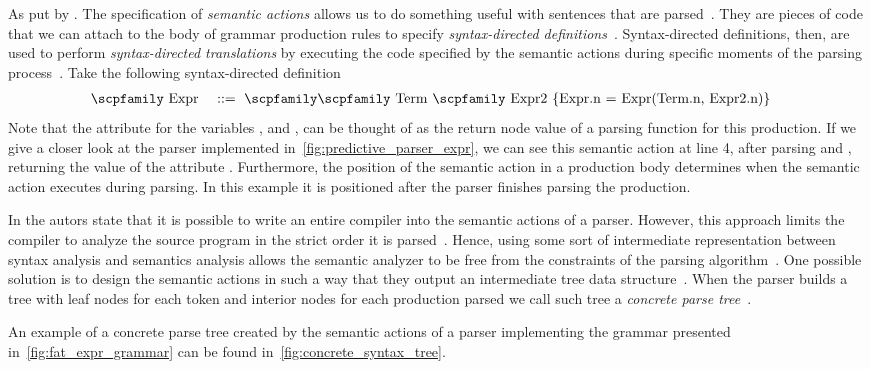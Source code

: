 \documentclass[
  oneside,
  english,
  coorientadorbanca,
  noabntexcite
]{ufsc-thesis-rn46-2019}
\def\bnfdef{::=}
\newcommand{\codett}[1]{\text{\scpfamily#1}}
\newcommand{\code}[1]{\text{\scpfamily\setlength\spaceskip{0.35em}#1}}
\newcommand{\bnfvar}[1]{\codett{#1}}
\newcommand{\bnfprod}[2]{\bnfvar{#1} & \ & \bnfdef{} & \ \code{#2}}
\begin{document}
As put by \textcite{appel2003modern} .
The specification of \textit{semantic actions} allows us to do something useful with sentences that are parsed~\cite{appel2003modern}.
They are pieces of code that we can attach to the body of grammar production rules to specify \textit{syntax-directed definitions}~\cite{Aho:2006:CPT:1177220}.
Syntax-directed definitions, then, are used to perform \textit{syntax-directed translations} by executing the code specified by the semantic actions during specific moments of the parsing process~\cite{Aho:2006:CPT:1177220}.
Take the following syntax-directed definition
\begin{alignat}{2}
  \bnfprod{Expr}{\bnfvar{Term} \bnfvar{Expr2} \{Expr.n = Expr(Term.n, Expr2.n)\}} \label{eq:sdd_example}
\end{alignat}
Note that the attribute \codett{n} for the variables \bnfvar{Expr}, \bnfvar{Term} and \bnfvar{Expr2}, can be thought of as the return node value of a parsing function for this production.
If we give a closer look at the parser implemented in~\cref{fig:predictive_parser_expr}, we can see this semantic action at line 4, after parsing \bnfvar{Term} and \bnfvar{Expr2}, returning the value of the attribute \codett{Expr.n}.
Furthermore, the position of the semantic action in a production body determines when the semantic action executes during parsing.
In this example it is positioned after the parser finishes parsing the production.

In \textcite{appel2003modern} the autors state that it is possible to write an entire compiler into the semantic actions of a parser.
However, this approach limits the compiler to analyze the source program in the strict order it is parsed~\cite{appel2003modern}.
Hence, using some sort of intermediate representation between syntax analysis and semantics analysis allows the semantic analyzer to be free from the constraints of the parsing algorithm~\cite{appel2003modern}.
One possible solution is to design the semantic actions in such a way that they output an intermediate tree data structure~\cite{appel2003modern}.
When the parser builds a tree with leaf nodes for each token and interior nodes for each production parsed we call such tree a \textit{concrete parse tree}~\cite{appel2003modern}.

An example of a concrete parse tree created by the semantic actions of a parser implementing the grammar presented in~\cref{fig:fat_expr_grammar} can be found in~\cref{fig:concrete_syntax_tree}.
\end{document}
